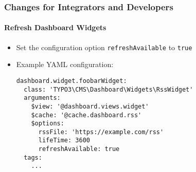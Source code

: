 %

\begin{frame}[fragile]
	\frametitle{Changes for Integrators and Developers}
	\framesubtitle{Refresh Dashboard Widgets}


	\begin{itemize}
		\item Set the configuration option \texttt{refreshAvailable} to \texttt{true}
		\item Example YAML configuration:
\begin{lstlisting}
dashboard.widget.foobarWidget:
  class: 'TYPO3\CMS\Dashboard\Widgets\RssWidget'
  arguments:
    $view: '@dashboard.views.widget'
    $cache: '@cache.dashboard.rss'
    $options:
      rssFile: 'https://example.com/rss'
      lifeTime: 3600
      refreshAvailable: true
  tags:
    ...
\end{lstlisting}

	\end{itemize}

\end{frame}

